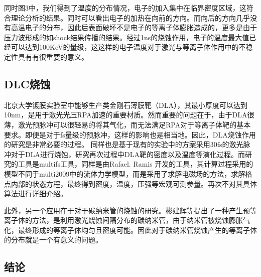 同时图3中，我们得到了温度的分布情况，电子的加入集中在临界密度区域，这符合理论分析的结果。同时可以看出电子的加热在向前的方向。而向后的方向几乎没有高温电子的分布，因此后表面破坏不是电子的等离子体膨胀造成的，更多是由于压力波形成的如shock结果传播的结果。经过1ns的烧蚀作用，电子的温度最大值已经可以达到100KeV的量级，这这样的电子温度对于激光与等离子体作用中的不稳定性具有有很重要的意义。



\subsection{DLC烧蚀}

北京大学镀膜实验室中能够生产类金刚石薄膜靶（DLA），其最小厚度可以达到10nm，是用于激光光压RPA加速的重要材质。然而重要的问题在于，由于DLA很薄，激光预脉冲可以很轻易的将其气化，而无法满足RPA对于等离子体靶的基本要求。即便是对于fs量级的预脉冲，这样的影响也是相当地。因此，DLA烧蚀作用的研究是非常必要的过程。
同样也是基于现有的实验中的方案采用30fs的激光脉冲对于DLA进行烧蚀，研究再次过程中DLA靶的密度以及温度等演化过程。而研究的工具是multifs工具，同样是由Rafael. Ramis 开发的工具，其计算过程采用的模型不同于multi2009中的流体力学模型，而是采用了求解电磁场的方法，求解格点内部的状态方程，最终得到密度，温度，压强等宏观可测参量。再次不对其具体算法进行详细介绍。






此外，另一个应用在于对于碳纳米管的烧蚀的研究。彬建辉等提出了一种产生预等离子体的方法，是利用激光烧蚀间隔分布的碳纳米管，由于纳米管被烧蚀膨胀气化，最终形成的等离子体均匀且密度可能。因此对于碳纳米管烧蚀产生的等离子体的分布就是一个有意义的问题。

\subsection{结论}
